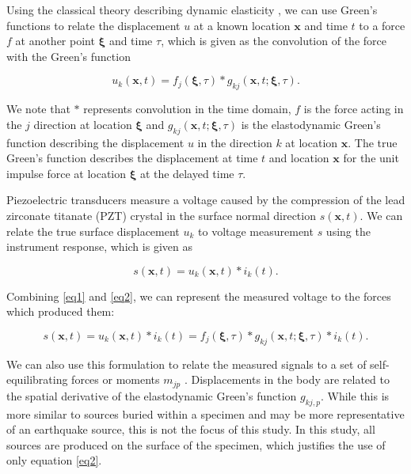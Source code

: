 \documentclass[preprint,3p, 11pt,authoryear]{elsarticle}
\begin{document}
Using the classical theory describing dynamic elasticity \citep{Aki2002}, we can use Green's functions to relate the displacement $u$ at a known location $\mathbf{x}$ and time $t$ to a force $f$ at another point $\mathbf{\xi}$ and time $\tau$, which is given as the convolution of the force with the Green's function

\begin{equation}
\label{eq1}
           u_{k}\left( \mathbf{x}, t \right)  =  
            f_{j}\left( \mathbf{\xi}, \tau \right) \ast 
            g_{kj}\left( \mathbf{x}, t;\mathbf{\xi}, \tau \right).
\end{equation}

\noindent We note that $\ast$ represents convolution in the time domain, $f$ is the force acting in the $j$ direction at location $\mathbf{\xi}$ and $g_{kj}\left( \mathbf{x}, t;\mathbf{\xi}, \tau \right)$ is the elastodynamic Green's function describing the displacement $u$ in the direction $k$ at location $\mathbf{x}$.  The true Green's function describes the displacement at time $t$ and location $\mathbf{x}$ for the unit impulse force at location $\mathbf{\xi}$ at the delayed time $\tau$. 

Piezoelectric transducers measure a voltage caused by the compression of the lead zirconate titanate (PZT) crystal in the surface normal direction $s\left( \mathbf{x}, t \right)$. We can relate the true surface displacement $u_{k}$ to voltage measurement $s$ using the instrument response, which is given as

    \begin{equation}
    \label{eq2}
        s\left( \mathbf{x}, t \right) =
            u_{k}\left( \mathbf{x}, t \right) \ast i_{k}\left(t \right).
    \end{equation}

\noindent Combining \eqref{eq1} and \eqref{eq2}, we can represent the measured voltage to the forces which produced them:

    \begin{equation}
    \label{eq3}
        s\left( \mathbf{x}, t \right) =
            u_{k}\left( \mathbf{x}, t \right) \ast i_{k}\left(t \right) =  
                f_{j}\left( \mathbf{\xi}, \tau \right) \ast 
                g_{kj}\left( \mathbf{x}, t;\mathbf{\xi}, \tau \right) \ast i_{k}\left( t \right).
    \end{equation}

\noindent We can also use this formulation to relate the measured signals to a set of self-equilibrating forces or moments $m_{jp}$ \citep{Aki2002}. Displacements in the body are related to the spatial derivative of the elastodynamic Green's function $g_{kj,p}$.  While this is more similar to sources buried within a specimen and may be more representative of an earthquake source, this is not the focus of this study.  In this study, all sources are produced on the surface of the specimen, which justifies the use of only equation \eqref{eq2}.
\end{document}
